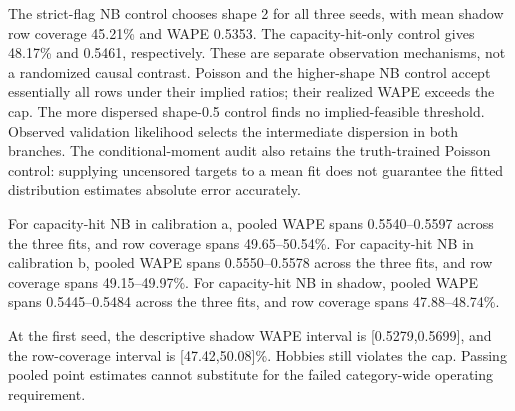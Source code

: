 The strict-flag NB control chooses shape 2 for all three seeds, with mean shadow row coverage 45.21\% and WAPE 0.5353. The capacity-hit-only control gives 48.17\% and 0.5461, respectively. These are separate observation mechanisms, not a randomized causal contrast. Poisson and the higher-shape NB control accept essentially all rows under their implied ratios; their realized WAPE exceeds the cap. The more dispersed shape-0.5 control finds no implied-feasible threshold. Observed validation likelihood selects the intermediate dispersion in both branches. The conditional-moment audit also retains the truth-trained Poisson control: supplying uncensored targets to a mean fit does not guarantee the fitted distribution estimates absolute error accurately.

For capacity-hit NB in calibration a, pooled WAPE spans 0.5540--0.5597 across the three fits, and row coverage spans 49.65--50.54\%. For capacity-hit NB in calibration b, pooled WAPE spans 0.5550--0.5578 across the three fits, and row coverage spans 49.15--49.97\%. For capacity-hit NB in shadow, pooled WAPE spans 0.5445--0.5484 across the three fits, and row coverage spans 47.88--48.74\%. 

At the first seed, the descriptive shadow WAPE interval is [0.5279,0.5699], and the row-coverage interval is [47.42,50.08]\%. Hobbies still violates the cap. Passing pooled point estimates cannot substitute for the failed category-wide operating requirement.

